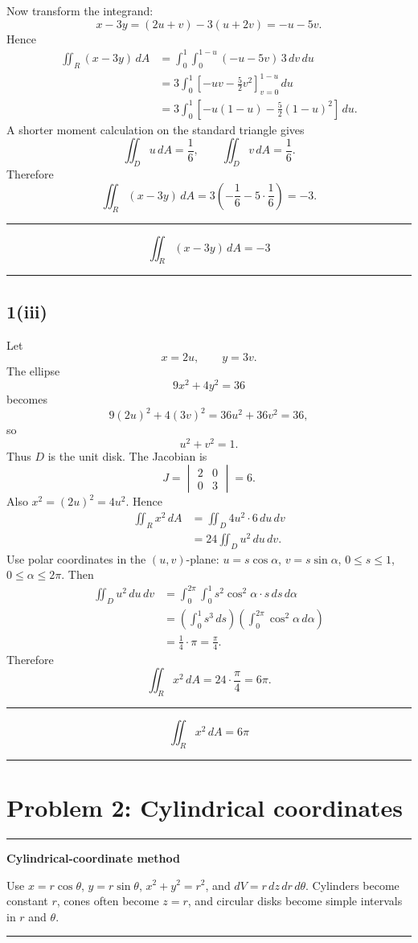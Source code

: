 \documentclass[11pt,a4paper]{article}
\newenvironment{methodbox}[1]{\par\medskip\noindent\begin{minipage}{\linewidth}\hrule\smallskip\textbf{#1}\par\smallskip}{\smallskip\hrule\end{minipage}\par\medskip}
\newenvironment{resultbox}{\par\medskip\noindent\begin{minipage}{\linewidth}\hrule\smallskip}{\smallskip\hrule\end{minipage}\par\medskip}
\newcommand{\ans}[1]{\begin{resultbox}\[\boxed{#1}\]\end{resultbox}}
\begin{document}
Now transform the integrand:
\[
x-3y=(2u+v)-3(u+2v)=-u-5v.
\]
Hence
\begin{align*}
\iint_R (x-3y)\,dA
&=\int_0^1\int_0^{1-u}(-u-5v)\,3\,dv\,du\\
&=3\int_0^1\left[-uv-\frac52v^2\right]_{v=0}^{1-u}\,du\\
&=3\int_0^1\left[-u(1-u)-\frac52(1-u)^2\right]\,du.
\end{align*}
A shorter moment calculation on the standard triangle gives
\[
\iint_D u\,dA=\frac16,
\qquad
\iint_D v\,dA=\frac16.
\]
Therefore
\[
\iint_R(x-3y)\,dA=3\left(-\frac16-5\cdot\frac16\right)=-3.
\]
\ans{\iint_R(x-3y)\,dA=-3}

\subsection*{1(iii)}
Let
\[
x=2u,
\qquad y=3v.
\]
The ellipse
\[
9x^2+4y^2=36
\]
becomes
\[
9(2u)^2+4(3v)^2=36u^2+36v^2=36,
\]
so
\[
u^2+v^2=1.
\]
Thus \(D\) is the unit disk. The Jacobian is
\[
J=\begin{vmatrix}2&0\\0&3\end{vmatrix}=6.
\]
Also \(x^2=(2u)^2=4u^2\). Hence
\begin{align*}
\iint_R x^2\,dA
&=\iint_D 4u^2\cdot 6\,du\,dv\\
&=24\iint_Du^2\,du\,dv.
\end{align*}
Use polar coordinates in the \((u,v)\)-plane: \(u=s\cos\alpha\), \(v=s\sin\alpha\), \(0\le s\le1\), \(0\le\alpha\le2\pi\). Then
\begin{align*}
\iint_Du^2\,du\,dv
&=\int_0^{2\pi}\int_0^1s^2\cos^2\alpha\cdot s\,ds\,d\alpha\\
&=\left(\int_0^1s^3\,ds\right)
\left(\int_0^{2\pi}\cos^2\alpha\,d\alpha\right)\\
&=\frac14\cdot\pi=\frac\pi4.
\end{align*}
Therefore
\[
\iint_Rx^2\,dA=24\cdot\frac\pi4=6\pi.
\]
\ans{\iint_Rx^2\,dA=6\pi}

\section{Problem 2: Cylindrical coordinates}

\begin{methodbox}{Cylindrical-coordinate method}
Use \(x=r\cos\theta\), \(y=r\sin\theta\), \(x^2+y^2=r^2\), and \(dV=r\,dz\,dr\,d\theta\). Cylinders become constant \(r\), cones often become \(z=r\), and circular disks become simple intervals in \(r\) and \(\theta\).
\end{methodbox}
\end{document}
